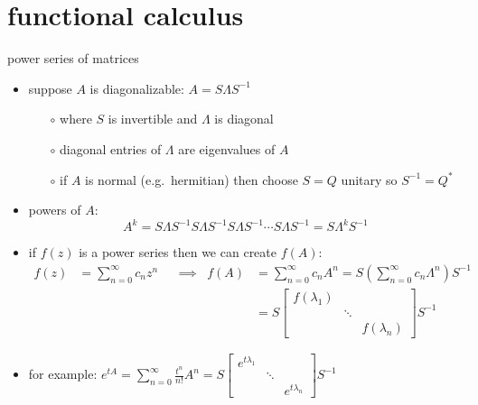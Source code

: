 \documentclass[10pt,hyperref]{beamer}
\begin{document}
\section{functional calculus}

\begin{frame}{power series of matrices}

\begin{itemize}
\item suppose $A$ is diagonalizable: $A = S \Lambda S^{-1}$
    \begin{itemize}
    \item[$\circ$] where $S$ is invertible and $\Lambda$ is diagonal
    \item[$\circ$] diagonal entries of $\Lambda$ are eigenvalues of $A$
    \item[$\circ$] if $A$ is normal (e.g.~hermitian) then choose $S=Q$ unitary so $S^{-1}=Q^*$
    \end{itemize}
\item powers of $A$:
    $$A^k = S \Lambda S^{-1} S \Lambda S^{-1} S \Lambda S^{-1} \cdots S \Lambda S^{-1} = S \Lambda^k S^{-1}$$
\item if $f(z)$ is a power series then we can create $f(A)$:
\small
\begin{align*}
f(z) &= \sum_{n=0}^\infty c_n z^n & &\implies & f(A) &= \sum_{n=0}^\infty c_n A^n = S \left(\sum_{n=0}^\infty c_n \Lambda^n\right) S^{-1} \\
     &&&& &= S \begin{bmatrix} f(\lambda_1) & & \\ & \ddots & \\ & & f(\lambda_n) \end{bmatrix} S^{-1}
\end{align*}
\normalsize
\item for example: \qquad \small
$\displaystyle e^{tA} = \sum_{n=0}^\infty \frac{t^n}{n!} A^n =  S \begin{bmatrix} e^{t\lambda_1} & & \\ & \ddots & \\ & & e^{t\lambda_n} \end{bmatrix} S^{-1}$
\end{itemize}
\end{frame}
\end{document}
